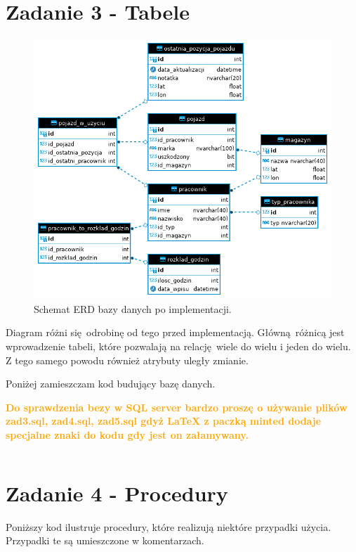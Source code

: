 \documentclass{article}
\begin{document}
\section{Zadanie 3 - Tabele}

\begin{figure}[H]
    \centering
    \includegraphics[width=\textwidth]{assets/chart-after-implementation.png}
    \caption{Schemat ERD bazy danych po implementacji.}
\end{figure}

Diagram różni się odrobinę od tego przed implementacją. Główną różnicą jest
wprowadzenie tabeli, które pozwalają na relację wiele do wielu i jeden do wielu.
Z tego samego powodu również atrybuty uległy zmianie.

Poniżej zamieszczam kod budujący bazę danych. 

\textbf{\textcolor{orange}{Do sprawdzenia bezy w SQL server bardzo proszę 
o używanie plików zad3.sql, zad4.sql, zad5.sql gdyż LaTeX z paczką minted
dodaje specjalne znaki do kodu gdy jest on załamywany.}}

\inputminted[breaklines]{sql}{../zad3.sql}

\section{Zadanie 4 - Procedury}

Poniższy kod ilustruje procedury, które realizują niektóre przypadki użycia.
Przypadki te są umieszczone w komentarzach.
\end{document}
